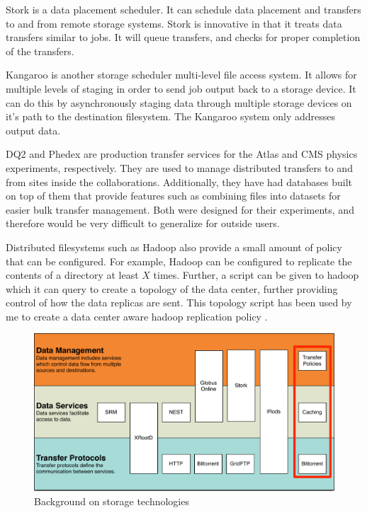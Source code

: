 Stork \cite{kosar2004stork} is a data placement scheduler.  It can schedule data placement and transfers to and from remote storage systems.  Stork is innovative in that it treats data transfers similar to jobs.  It will queue transfers, and checks for proper completion of the transfers.

Kangaroo \cite{thain2001kangaroo} is another storage scheduler multi-level file access system.  It allows for multiple levels of staging in order to send job output back to a storage device.  It can do this by asynchronously staging data through multiple storage devices on it's path to the destination filesystem.  The Kangaroo system only addresses output data.

DQ2 \cite{branco2008managing} and Phedex \cite{rehn2006phedex} are production transfer services for the Atlas and CMS physics experiments, respectively.  They are used to manage distributed transfers to and from sites inside the collaborations.  Additionally, they have had databases built on top of them that provide features such as combining files into datasets for easier bulk transfer management.  Both were designed for their experiments, and therefore would be very difficult to generalize for outside users.

Distributed filesystems such as Hadoop also provide a small amount of policy that can be configured.  For example, Hadoop can be configured to replicate the contents of a directory at least $X$ times.  Further, a script can be given to hadoop which it can query to create a topology of the data center, further providing control of how the data replicas are sent.  This topology script has been used by me to create a data center aware hadoop replication policy \cite{he2012hog}.

\begin{figure}[ht!]
	\centering
	\includegraphics[width=\textwidth]{images/BackgroundStorageDiagram2.pdf}
	\caption{Background on storage technologies}
	\label{fig:backgroundstorage}
\end{figure}

